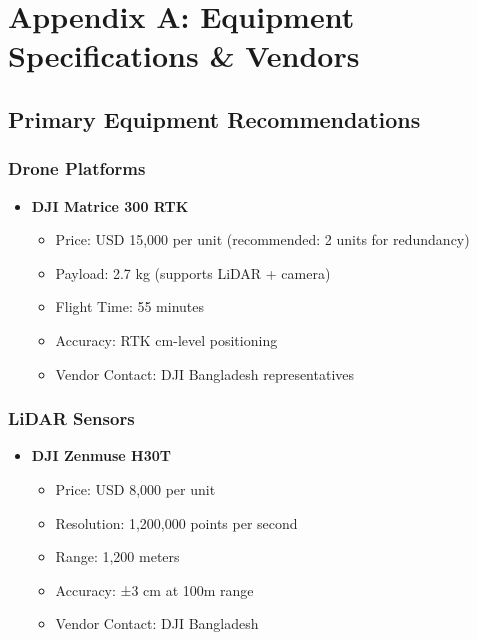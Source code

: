 
\chapter*{Appendix A: Equipment Specifications \& Vendors}

\section*{Primary Equipment Recommendations}

\subsection*{Drone Platforms}

\begin{itemize}
    \item \textbf{DJI Matrice 300 RTK}
    \begin{itemize}
        \item Price: USD 15,000 per unit (recommended: 2 units for redundancy)
        \item Payload: 2.7 kg (supports LiDAR + camera)
        \item Flight Time: 55 minutes
        \item Accuracy: RTK cm-level positioning
        \item Vendor Contact: DJI Bangladesh representatives
    \end{itemize}
\end{itemize}

\subsection*{LiDAR Sensors}

\begin{itemize}
    \item \textbf{DJI Zenmuse H30T}
    \begin{itemize}
        \item Price: USD 8,000 per unit
        \item Resolution: 1,200,000 points per second
        \item Range: 1,200 meters
        \item Accuracy: ±3 cm at 100m range
        \item Vendor Contact: DJI Bangladesh
    \end{itemize}
\end{itemize}

